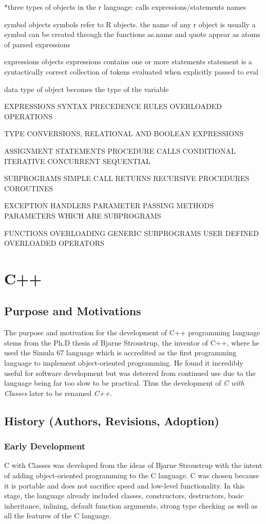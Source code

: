 \documentclass[12pt]{article}
\begin{document}
*three types of objects in the r language:
calls
expressions/statements
names

symbol objects
symbols refer to R objects. the name of any r object is usually a symbol
can be created through the functions as.name and quote
appear as atoms of parsed expressions

expressions objects
expressions contains one or more statements
statement is a syntactically correct collection of tokens
evaluated when explicitly passed to eval

data type of object becomes the type of the variable




EXPRESSIONS
SYNTAX
PRECEDENCE RULES
OVERLOADED OPERATIONS

TYPE CONVERSIONS, RELATIONAL AND BOOLEAN EXPRESSIONS

ASSIGNMENT STATEMENTS
PROCEDURE CALLS
CONDITIONAL
ITERATIVE
CONCURRENT
SEQUENTIAL

SUBPROGRAMS
SIMPLE CALL RETURNS
RECURSIVE PROCEDURES
COROUTINES

EXCEPTION HANDLERS
PARAMETER PASSING METHODS
PARAMETERS WHICH ARE SUBPROGRAMS

FUNCTIONS OVERLOADING
GENERIC SUBPROGRAMS
USER DEFINED OVERLOADED OPERATORS

\fi


\section{C++}
\subsection{Purpose and Motivations}
The purpose and motivation for the development of C++ programming language stems from the Ph.D thesis of Bjarne Stroustrup, the
inventor of C++, where he used the Simula 67 language which is accredited as the first programming language to implement 
object-oriented programming. He found it incredibly useful for software development but was deterred from continued use
due to the language being far too slow to be practical. Thus the development of \textit{C with Classes} later to be renamed \textit{C++}.
\subsection{History (Authors, Revisions, Adoption)}
\subsubsection{Early Development}
C with Classes was developed from the ideas of Bjarne Stroustrup with the intent of adding object-oriented programming to the C language. C was chosen because it is portable and does not sacrifice speed and low-level functionality. In this stage, the language already included classes, constructors, destructors, basic inheritance, inlining, default function arguments, strong type checking as well as all the features of the C language.
\end{document}
